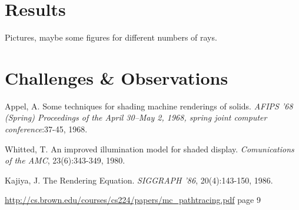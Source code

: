 \documentclass[journal]{IEEEtran}
\begin{document}
\section{Results}
Pictures, maybe some figures for different numbers of rays.

\section{Challenges \& Observations}



\begin{thebibliography}{4}

Appel, A. Some techniques for shading machine renderings of solids. \emph{AFIPS '68 (Spring) Proceedings of the April 30--May 2, 1968, spring joint computer conference}:37-45, 1968.

Whitted, T. An improved illumination model for shaded display. \emph{Comunications of the AMC}, 23(6):343-349, 1980.

Kajiya, J. The Rendering Equation. \emph{SIGGRAPH '86}, 20(4):143-150, 1986.

\url{http://cs.brown.edu/courses/cs224/papers/mc_pathtracing.pdf} page 9

\end{thebibliography}

\end{document}
